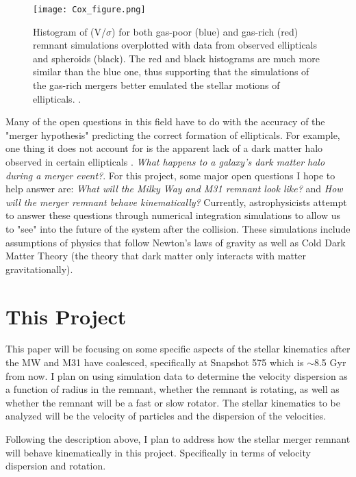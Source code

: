 \documentclass[twocolumn]{aastex63}
\begin{document}
\begin{figure}
    \centering
    \texttt{[image: Cox\_figure.png]}
    \caption{Histogram of (V/$\sigma$) for both gas-poor (blue) and gas-rich (red) remnant simulations overplotted with data from observed ellipticals and spheroids (black).  The red and black histograms are much more similar than the blue one, thus supporting that the simulations of the gas-rich mergers better emulated the stellar motions of ellipticals. \citep{2006ApJ...650..791C}.}
    \label{fig:my_label}
\end{figure}

Many of the open questions in this field have to do with the accuracy of the "merger hypothesis" predicting the correct formation of ellipticals.  For example, one thing it does not account for is the apparent lack of a dark matter halo observed in certain ellipticals \citep{2003Sci...301.1696R}.  \textit{What happens to a galaxy's dark matter halo during a merger event?}. For this project, some major open questions I hope to help answer are: \textit{What will the Milky Way and M31 remnant look like?} and \textit{How will the merger remnant behave kinematically?}  Currently, astrophysicists attempt to answer these questions through numerical integration simulations to allow us to "see" into the future of the system after the collision.  These simulations include assumptions of physics that follow Newton's laws of gravity as well as Cold Dark Matter Theory (the theory that dark matter only interacts with matter gravitationally).    

\section{This Project} \label{sec:style}

This paper will be focusing on some specific aspects of the stellar kinematics after the MW and M31 have coalesced, specifically at Snapshot 575 which is $\sim$8.5 Gyr from now.  I plan on using simulation data to determine the velocity dispersion as a function of radius in the remnant, whether the remnant is rotating, as well as whether the remnant will be a fast or slow rotator.  The stellar kinematics to be analyzed will be the velocity of particles and the dispersion of the velocities.

Following the description above, I plan to address how the stellar merger remnant will behave kinematically in this project.  Specifically in terms of velocity dispersion and rotation. 
\end{document}
